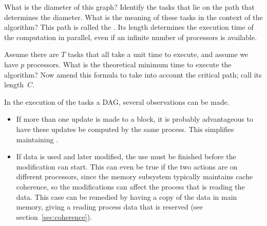 \begin{exercise}
  What is the diameter of this graph? Identify the tasks that lie on
  the path that determines the diameter. What is the meaning of these
  tasks in the context of the algorithm? This path is called the
  . Its length determines the execution time of the
  computation in parallel, even if an infinite number of processors is
  available.
\end{exercise}

\begin{exercise}
  Assume there are $T$ tasks that all take a unit time to execute, and
  assume we have $p$ processors. What is the
  theoretical minimum time to execute the algorithm? Now amend this
  formula to take into account the critical path; call its length~$C$.
\end{exercise}

In the execution of the tasks a \ac{DAG}, several observations
can be made.
\begin{itemize}
\item If more than one update is made to a block, it is probably
  advantageous to have these updates be computed by the same
  process. This simplifies maintaining .
\item If data is used and later modified, the use must be finished
  before the modification can start. This can even be true if the two
  actions are on different processors, since the memory subsystem
  typically maintains cache coherence, so the modifications can affect the
  process that is reading the data. This case can be remedied by
  having a copy of the data in main memory, giving a reading process
  data that is reserved (see section~\ref{sec:coherence}).
\end{itemize}

\endinput

The concept of lookahead has been to used to parallelize operations
such as the $LU$ factorization.
The $LU$ factorization subproblem performed within each iteration of
the loop updates a block on the diagonal of the matrix $A_{kk}$.
With the exception of the first iteration, this diagonal block is
previously updated by a 
matrix-matrix multiplication update.
For instance,
$A_{22} \leftarrow A_{22} - A_{21} A_{12}$ resides within the first
iteration while
$A_{22} \leftarrow LU( A_{22} )$ resides within the second iteration.
As we noted above, each of these updates can be paralleled in
parallel, so lookahead attempts to schedule the block update on the
diagonal first.
Once that block is updated, the $LU$ subproblem is ``computed ahead''
of its current iteration in parallel with the remaining block updates
from the current iteration.
This process can be done repeated for multiple iterations ahead of the
current iteration in order to exploit more opportunities for
parallelism.

